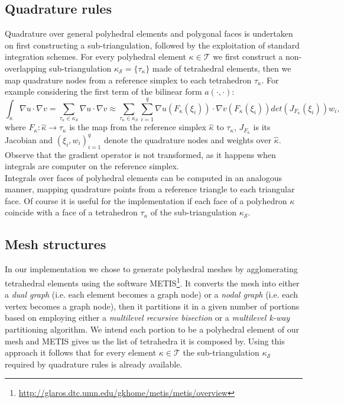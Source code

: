 \documentclass[12pt, a4paper]{article}
\theoremstyle{definition}
\theoremstyle{plain}
\theoremstyle{plain}
\theoremstyle{definition}
\begin{document}
\subsection{Quadrature rules}
Quadrature over general polyhedral elements and polygonal faces is undertaken 
on first constructing a sub-triangulation, followed by the exploitation of 
standard integration schemes. For every polyhedral element $\kappa \in 
\mathcal{T}$ we first construct a non-overlapping sub-triangulation 
$\kappa_\mathcal{S} = \{\tau_\kappa\}$ made of tetrahedral elements, then we 
map quadrature nodes from a reference simplex to each tetrahedron 
$\tau_\kappa$. For example considering the first term of the bilinear form 
$a(\cdot, \cdot)$:
\begin{equation*}
	\int_\kappa \nabla u \cdot \nabla v = \sum_{\tau_\kappa \in \kappa_\mathcal{S}} \nabla u \cdot \nabla v \approx \sum_{\tau_\kappa \in \kappa_\mathcal{S}} \sum_{i=1}^{q} \nabla u(F_\kappa(\xi_i)) \cdot \nabla v(F_\kappa(\xi_i)) det(J_{F_\kappa}(\xi_i))w_i,
\end{equation*}
where $F_\kappa: \hat{\kappa} \rightarrow \tau_\kappa$ is the map from the 
reference simplex $\hat{\kappa}$ to $\tau_\kappa$, $J_{F_\kappa}$ is its 
Jacobian	and $(\xi_i, w_i)^q_{i=1}$ denote the quadrature nodes and weights 
over $\hat{\kappa}$. Observe that the gradient operator is not transformed, as 
it happens when integrals are computer on the reference simplex.\\
Integrals over faces of polyhedral elements can be computed in an analogous 
manner, mapping quadrature points from a reference triangle to each triangular 
face. Of course it is useful for the implementation if each face of a 
polyhedron $\kappa$ coincide with a face of a tetrahedron $\tau_\kappa$ of the 
sub-triangulation $\kappa_\mathcal{S}$.
\subsection{Mesh structures}
In our implementation we chose to generate polyhedral meshes by agglomerating 
tetrahedral elements using the software 
METIS\footnote{\url{http://glaros.dtc.umn.edu/gkhome/metis/metis/overview}}. It 
converts the mesh into either a \textit{dual graph} (i.e. each element becomes 
a graph node) or a \textit{nodal graph} (i.e. each vertex becomes a graph 
node), then it partitions it in a given number of portions based on employing 
either a \textit{multilevel recursive bisection} or a \textit{multilevel k-way} 
partitioning algorithm. We intend each portion to be a polyhedral element of 
our mesh and METIS gives us the list of tetrahedra it is composed by. Using 
this approach it follows that for every element $\kappa \in \mathcal{T}$ the 
sub-triangulation $\kappa_\mathcal{S}$ required by quadrature rules is already 
available.
\newpage
\end{document}
